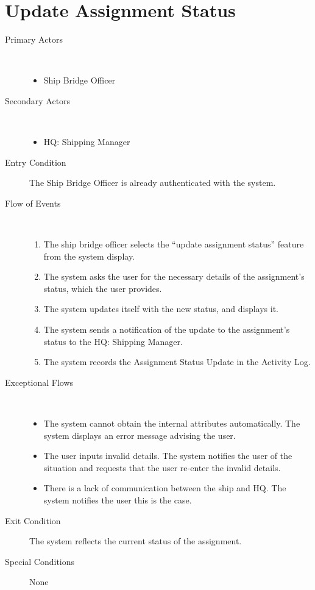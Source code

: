 \documentclass[a4paper,10pt]{report}
\begin{document}
\section{Update Assignment Status}
\begin{description}
  \item[Primary Actors] \
    \begin{itemize}
      \item Ship Bridge Officer
    \end{itemize}
  \item[Secondary Actors] \
    \begin{itemize}
      \item HQ: Shipping Manager
    \end{itemize}
  \item[Entry Condition]
    The Ship Bridge Officer is already authenticated with the system.
  \item[Flow of Events] \
    \begin{enumerate}
      \item The ship bridge officer selects the ``update assignment status'' feature from the system display.
      \item The system asks the user for the necessary details of the assignment's status, which the user provides.
      \item The system updates itself with the new status, and displays it.
      \item The system sends a notification of the update to the assignment's status to the HQ: Shipping Manager.
    \item The system records the Assignment Status Update in the Activity Log.
    \end{enumerate}
  \item[Exceptional Flows] \
    \begin{itemize}
      \item The system cannot obtain the internal attributes automatically. The system displays an error message advising the user.
      \item The user inputs invalid details. The system notifies the user of the situation and requests that the user re-enter the invalid details.
      \item There is a lack of communication between the ship and HQ. The system notifies the user this is the case.
    \end{itemize}
  \item[Exit Condition] The system reflects the current status of the assignment.
  \item[Special Conditions] None
\end{description}
\end{document}
